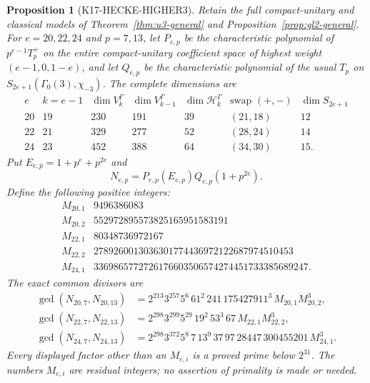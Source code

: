 \documentclass[11pt,a4paper]{article}
\newtheorem{proposition}[theorem]{Proposition}
\theoremstyle{definition}
\begin{document}
\begin{proposition}[K17-HECKE-HIGHER3]
\label{prop:hecke-higher3}
Retain the full compact-unitary and classical models of
Theorem~\ref{thm:u3-general} and Proposition~\ref{prop:gl2-general}.
For \(e=20,22,24\) and \(p=7,13\), let \(P_{e,p}\) be the
characteristic polynomial of \(p^{e-1}T_p^+\) on the entire
compact-unitary coefficient space of highest weight
\((e-1,0,1-e)\), and let \(Q_{e,p}\) be the characteristic
polynomial of the usual \(T_p\) on
\(S_{2e+1}(\Gamma_0(3),\chi_{-3})\).
The complete dimensions are
\[
\begin{array}{c|c|r|r|r|c|r}
e&k=e-1&\dim V_k^\Gamma&\dim V_{k-1}^\Gamma&
\dim\mathcal H_k^\Gamma&\text{swap }(+,-)&
\dim S_{2e+1}\\ \hline
20&19&230&191&39&(21,18)&12\\
22&21&329&277&52&(28,24)&14\\
24&23&452&388&64&(34,30)&15 .
\end{array}
\tag{HH3.1}
\]
Put \(E_{e,p}=1+p^e+p^{2e}\) and
\[
 N_{e,p}=P_{e,p}(E_{e,p})Q_{e,p}(1+p^{2e}).
 \tag{HH3.2}
\]
Define the following positive integers:
\[
\begin{array}{c|r}
M_{20,1}&9496386083\\
M_{20,2}&552972895573825165951583191\\
M_{22,1}&80348736972167\\
M_{22,2}&2789260013036301774436972122687974510453\\
M_{24,1}&3369865772726176603506574274451733385689247 .
\end{array}
\tag{HH3.3}
\]
The exact common divisors are
\[
\begin{aligned}
\gcd(N_{20,7},N_{20,13})
 &=2^{213}3^{257}5^6\,61^2\,241\,175427911^3\,
        M_{20,1}M_{20,2}^3,\\
\gcd(N_{22,7},N_{22,13})
 &=2^{298}3^{299}5^{29}\,19^2\,53^3\,67\,
        M_{22,1}M_{22,2}^3,\\
\gcd(N_{24,7},N_{24,13})
 &=2^{298}3^{372}5^8\,7\,13^9\,37\,97\,28447\,
        300455201\,M_{24,1}^3 .
\end{aligned}
\tag{HH3.4}
\]
Every displayed factor other than an \(M_{e,i}\) is a proved
prime below \(2^{31}\).
The numbers \(M_{e,i}\) are residual integers; no assertion
of primality is made or needed.
\end{proposition}
\end{document}

